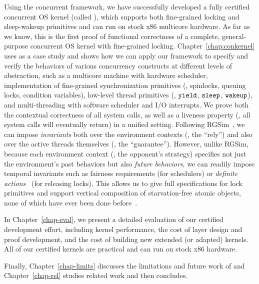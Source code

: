  Using the concurrent \CTOS{} framework, we have successfully developed a fully certified
  concurrent OS kernel (called {\bf \cCTOS}),
which  supports both fine-grained locking and sleep-wakeup primitives and
  can run on stock x86 multicore hardware.
  As far as we 
  know, this is the first proof of functional correctness of a complete,
  general-purpose concurrent OS kernel with fine-grained locking.
  Chapter~\ref{chap:conkernel} uses \cCTOS{}
  as a case study and shows how we can apply our framework
  to specify and verify the behaviors of various concurrency
  constructs at different levels of abstraction, such as a multicore
  machine with hardware scheduler, implementation of fine-grained
  synchronization primitives (\eg, spinlocks, queuing locks,
  condition variables), low-level thread primitives (\eg, ${\texttt{yield}}$,
  ${\texttt{sleep}}$, ${\texttt{wakeup}}$), and multi-threading with software scheduler and I/O
  interrupts.
  We prove both the contextual
  correctness of all system calls, as well as a liveness property 
  (\ie,  all system calls will eventually return)
  in a unified setting.
  Following RGSim~\cite{RGSim}, we can impose
  {\em invariants} both over the environment contexts (\ie, the ``rely'')
  and also over the active threads themselves (\ie, the ``guarantee'').
  However, unlike RGSim,
  because each environment context (\ie, the opponent's strategy)
  specifies not just the environment's past behaviors
  but also {\em future behaviors}, we can readily impose temporal
  invariants such as fairness requirements (for schedulers) or
  {\em definite actions}~\cite{lili16} (for releasing locks). This allows
  us to give full specifications for lock primitives and support vertical
  composition of starvation-free atomic objects, none of which have ever
  been done before~\cite{lili16}.
    
    
In Chapter~\ref{chap-eval},   we present a detailed evaluation of our certified development
  effort, including kernel performance, the cost of
  layer design and proof development,
  and the cost of building new extended (or adapted)
  kernels. All of our certified kernels are practical and can run on stock
  x86 hardware. 
    
 Finally, Chapter~\ref{chap-limits} discusses
 the limitations and future work of \CTOS{} and
Chapter~\ref{chap-rel}
 studies related work and  then concludes.




